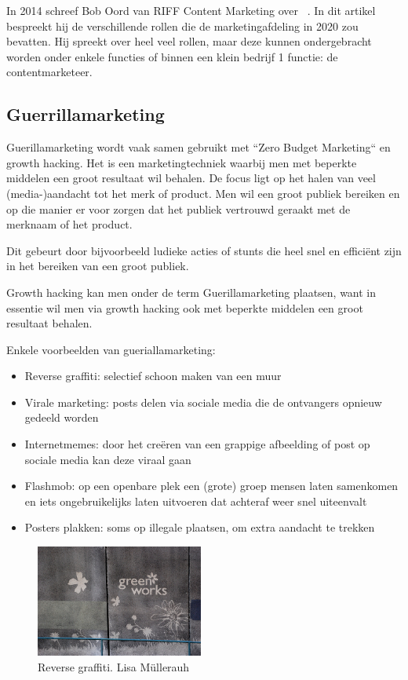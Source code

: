 In 2014 schreef Bob Oord van RIFF Content Marketing over ~. In dit artikel bespreekt hij de verschillende rollen die de marketingafdeling in 2020 zou bevatten. Hij spreekt over heel veel rollen, maar deze kunnen ondergebracht worden onder enkele functies of binnen een klein bedrijf 1 functie: de contentmarketeer. 

\subsection{Guerrillamarketing} \label{subsec:guerrillamarketing}
Guerillamarketing wordt vaak samen gebruikt met ``Zero Budget Marketing`` en growth hacking. Het is een marketingtechniek waarbij men met beperkte middelen een groot resultaat wil behalen. De focus ligt op het halen van veel (media-)aandacht tot het merk of product. Men wil een groot publiek bereiken en op die manier er voor zorgen dat het publiek vertrouwd geraakt met de merknaam of het product.

Dit gebeurt door bijvoorbeeld ludieke acties of stunts die heel snel en efficiënt zijn in het bereiken van een groot publiek. 

Growth hacking kan men onder de term Guerillamarketing plaatsen, want in essentie wil men via growth hacking ook met beperkte middelen een groot resultaat behalen.

Enkele voorbeelden van gueriallamarketing:
 
\begin{itemize}
	\item Reverse graffiti: selectief schoon maken van een muur 
	\item Virale marketing: posts delen via sociale media die de ontvangers opnieuw gedeeld worden
	\item Internetmemes: door het creëren van een grappige afbeelding of post op sociale media kan deze viraal gaan
	\item Flashmob: op een openbare plek een (grote) groep mensen laten samenkomen en iets ongebruikelijks laten uitvoeren dat achteraf weer snel uiteenvalt
	\item Posters plakken: soms op illegale plaatsen, om extra aandacht te trekken
\end{itemize}

\begin{figure}[h!]
	\includegraphics[width=55mm]{img/reverse-graffiti.jpg}
	\centering
	\caption{Reverse graffiti. \textcopyright  Lisa Müllerauh}
	\label{fig:defGrowthHacker}
\end{figure}

